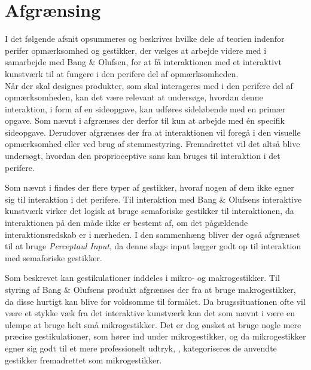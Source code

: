 \section{Afgrænsing}
\label{Afgraensning}
%
I det følgende afsnit opsummeres og beskrives hvilke dele af teorien indenfor perifer opmærksomhed og gestikker, der vælges at arbejde videre med i samarbejde med Bang $\&$ Olufsen, for at få interaktionen med et interaktivt kunstværk til at fungere i den perifere del af opmærksomheden. \\

Når der skal designes produkter, som skal interageres med i den perifere del af opmærksomheden, kan det være relevant at undersøge, hvordan denne interaktion, i form af en sideopgave, kan udføres sideløbende med en primær opgave. Som nævnt i  afgrænses der derfor til kun at arbejde med én specifik sideopgave. Derudover afgrænses der fra at interaktionen vil foregå i den visuelle opmærksomhed eller ved brug af stemmestyring. Fremadrettet vil det altså blive undersøgt, hvordan den proprioceptive sans kan bruges til interaktion i det perifere. 

Som nævnt i  findes der flere typer af gestikker, hvoraf nogen af dem ikke egner sig til interaktion i det perifere. Til interaktion med Bang $\&$ Olufsens interaktive kunstværk virker det logisk at bruge semaforiske gestikker til interaktionen, da interaktionen på den måde ikke er bestemt af, om det pågældende interaktionsredskab er i nærheden. I den sammenhæng bliver der også afgrænset til at bruge \textit{Perceptaul Input}, da denne slags input lægger godt op til interaktion med semaforiske gestikker.

Som beskrevet kan gestikulationer inddeles i mikro- og makrogestikker. Til styring af Bang $\&$ Olufsens produkt afgrænses der fra at bruge makrogestikker, da disse hurtigt kan blive for voldsomme til formålet. Da brugssituationen ofte vil være et stykke væk fra det interaktive kunstværk kan det som nævnt i  være en ulempe at bruge helt små mikrogestikker. Det er dog ønsket at bruge nogle mere præcise gestikulationer, som hører ind under mikrogestikker, og da mikrogestikker egner sig godt til et mere professionelt udtryk, \parencite[s. 10]{PDF:UsabilityofMicroVsMacroGestures}, kategoriseres de anvendte gestikker fremadrettet som mikrogestikker. \\

